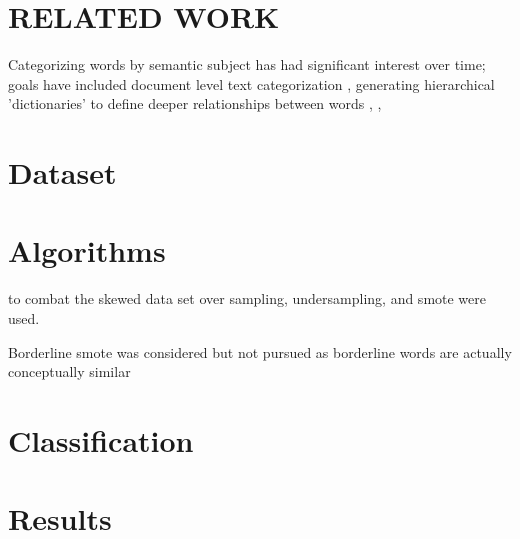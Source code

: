 \documentclass[%
 reprint,
 amsmath,amssymb,
 aps,
]{revtex4-1}
\begin{document}
\section{\label{sec:level1}RELATED WORK}

Categorizing words by semantic subject has had significant interest over time; goals have included document level text categorization \cite{Dumais_et_al},  generating hierarchical 'dictionaries' to define deeper relationships between words \cite{Morita_et_al},  \cite{Morita_et_al},





\section{\label{sec:level1}Dataset}




\section{\label{sec:level1}Algorithms}

to combat the skewed data set over sampling, undersampling, and smote were used.

Borderline smote was considered but not pursued as borderline words are actually conceptually similar





\section{\label{sec:level1}Classification}




\section{\label{sec:level1}Results}
\end{document}
